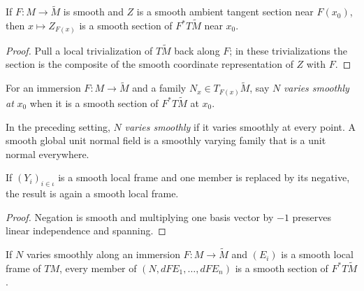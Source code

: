 \begin{lemma}
\label{lem:pullback-comp-section}
\leanok
{}
If $F:M\to\widetilde M$ is smooth and $Z$ is a smooth ambient tangent section near $F(x_0)$, then $x\mapsto Z_{F(x)}$ is a smooth section of $F^*T\widetilde M$ near $x_0$.
\end{lemma}

\begin{proof}
\leanok
{}
\sketch Pull a local trivialization of $T\widetilde M$ back along $F$; in these trivializations the section is the composite of the smooth coordinate representation of $Z$ with $F$.
\end{proof}

\begin{definition}
\label{def:smooth-normal-at}
\leanok
{}
For an immersion $F:M\to\widetilde M$ and a family $N_x\in T_{F(x)}\widetilde M$, say $N$ \emph{varies smoothly at} $x_0$ when it is a smooth section of $F^*T\widetilde M$ at $x_0$.
\end{definition}

\begin{definition}
\label{def:smooth-unit-normal-field}
\leanok
{}
In the preceding setting, $N$ \emph{varies smoothly} if it varies smoothly at every point. A smooth global unit normal field is a smoothly varying family that is a unit normal everywhere.
\end{definition}

\begin{lemma}
\label{lem:frame-neg-member}
\leanok
If $(Y_i)_{i\in\iota}$ is a smooth local frame and one member is replaced by its negative, the result is again a smooth local frame.
\end{lemma}

\begin{proof}
\leanok
\sketch Negation is smooth and multiplying one basis vector by $-1$ preserves linear independence and spanning.
\end{proof}

\begin{lemma}
\label{lem:adapted-frame-smooth}
\leanok
{}
If $N$ varies smoothly along an immersion $F:M\to\widetilde M$ and $(E_i)$ is a smooth local frame of $TM$, every member of $(N,dFE_1,\ldots,dFE_n)$ is a smooth section of $F^*T\widetilde M$.
\end{lemma}

